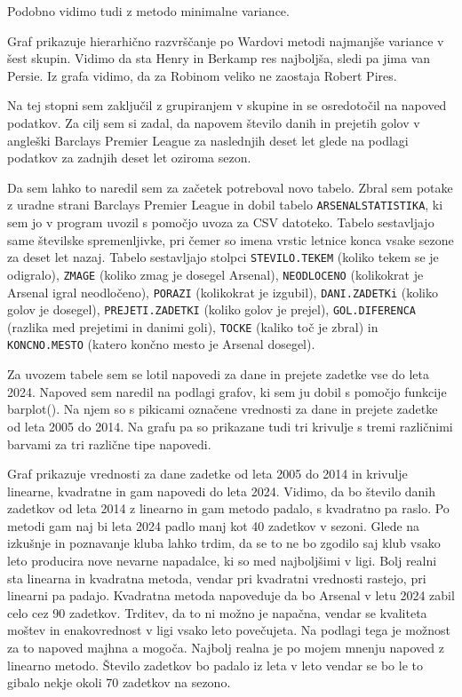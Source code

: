 \documentclass[11pt,a4paper]{article}
\begin{document}
Podobno vidimo tudi z metodo minimalne variance. 


Graf prikazuje hierarhično razvrščanje po Wardovi metodi najmanjše variance v šest skupin.
Vidimo da sta Henry in Berkamp res najboljša, sledi pa jima van Persie. Iz grafa vidimo, da za Robinom veliko ne zaostaja Robert Pires.

\newpage
Na tej stopni sem zaključil z grupiranjem v skupine in se osredotočil na napoved podatkov. Za cilj sem si zadal, da napovem število danih in prejetih golov v angleški Barclays Premier League za naslednjih deset let glede na podlagi podatkov za zadnjih deset let oziroma sezon.

Da sem lahko to naredil sem za začetek potreboval novo tabelo. Zbral sem potake z uradne strani  
Barclays Premier League in dobil tabelo \verb|ARSENALSTATISTIKA|, ki sem jo v program uvozil s pomočjo uvoza za CSV datoteko. Tabelo sestavljajo same številske spremenljivke, pri čemer so imena vrstic letnice konca vsake sezone za deset let nazaj. Tabelo sestavljajo stolpci \verb|STEVILO.TEKEM| (koliko tekem se je odigralo), \verb|ZMAGE| (koliko zmag je dosegel Arsenal), \verb|NEODLOCENO| (kolikokrat je Arsenal igral neodločeno), \verb|PORAZI| (kolikokrat je izgubil), \verb|DANI.ZADETKi| (koliko golov je dosegel), \verb|PREJETI.ZADETKI| (koliko golov je prejel), \verb|GOL.DIFERENCA| (razlika med prejetimi in danimi goli), \verb|TOCKE| (kaliko toč je zbral) in \verb|KONCNO.MESTO| (katero končno mesto je Arsenal dosegel).

Za uvozem tabele sem se lotil napovedi za dane in prejete zadetke vse do leta 2024. Napoved sem naredil na podlagi grafov, ki sem ju dobil s pomočjo funkcije barplot(). Na njem so s pikicami označene vrednosti za dane in prejete zadetke od leta 2005 do 2014. Na grafu pa so prikazane tudi tri krivulje s tremi različnimi barvami za tri različne tipe napovedi.


Graf prikazuje vrednosti za dane zadetke od leta 2005 do 2014 in krivulje linearne, kvadratne in gam napovedi do leta 2024. Vidimo, da bo število danih zadetkov od leta 2014 z linearno in gam metodo padalo, s kvadratno pa raslo. Po metodi gam naj bi leta 2024 padlo manj kot 40 zadetkov v sezoni. Glede na izkušnje in poznavanje kluba lahko trdim, da se to ne bo zgodilo saj klub vsako leto producira nove nevarne napadalce, ki so med najboljšimi v ligi. Bolj realni sta linearna in kvadratna metoda, vendar pri kvadratni vrednosti rastejo, pri linearni pa padajo. Kvadratna metoda napoveduje da bo Arsenal v letu 2024 zabil celo cez 90 zadetkov. Trditev, da to ni možno je napačna, vendar se kvaliteta moštev in enakovrednost v ligi vsako leto povečujeta. Na podlagi tega je možnost za to napoved majhna a mogoča. Najbolj realna je po mojem mnenju napoved z linearno metodo. Število zadetkov bo padalo iz leta v leto vendar se bo le to gibalo nekje okoli 70 zadetkov na sezono. 
\end{document}

